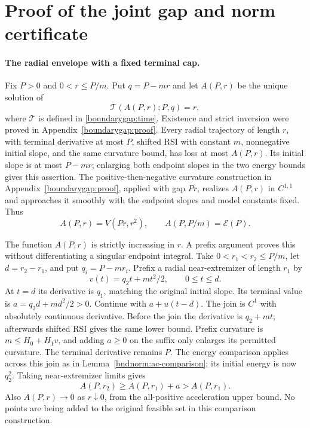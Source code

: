 \section{Proof of the joint gap and norm certificate}
\label{joint:proof}

\paragraph{The radial envelope with a fixed terminal cap.}
Fix $P>0$ and $0<r\le P/m$. Put $q=P-mr$ and let $A(P,r)$ be
the unique solution of
\[
 \mathcal T(A(P,r);P,q)=r,
\]
where $\mathcal T$ is defined in \eqref{boundarygap:time}.
Existence and strict inversion were proved in
Appendix~\ref{boundarygap:proof}. Every radial trajectory of length
$r$, with terminal derivative at most $P$, shifted RSI with constant
$m$, nonnegative initial slope, and the same curvature bound, has
loss at most $A(P,r)$. Its initial slope is at most $P-mr$;
enlarging both endpoint slopes in the two energy bounds gives this
assertion. The positive-then-negative curvature construction in
Appendix~\ref{boundarygap:proof}, applied with gap $Pr$, realizes
$A(P,r)$ in $C^{1,1}$ and approaches it smoothly with the endpoint
slopes and model constants fixed. Thus
\begin{equation}\label{joint:radial-identity}
 A(P,r)=V(Pr,r^2),\qquad A(P,P/m)=\mathcal E(P).
\end{equation}

The function $A(P,r)$ is strictly increasing in $r$. A prefix argument
proves this without differentiating a singular endpoint integral.
Take $0<r_1<r_2\le P/m$, let $d=r_2-r_1$, and put
$q_i=P-mr_i$. Prefix a radial near-extremizer of length $r_1$ by
\[
 v(t)=q_2t+mt^2/2,\qquad 0\le t\le d.
\]
At $t=d$ its derivative is $q_1$, matching the original initial
slope. Its terminal value is
$a=q_2d+md^2/2>0$. Continue with $a+u(t-d)$.
The join is $C^1$ with absolutely continuous derivative. Before
the join the derivative is $q_2+mt$; afterwards shifted RSI gives
the same lower bound. Prefix curvature is $m\le H_0+H_1v$, and
adding $a\ge0$ on the suffix only enlarges its permitted curvature.
The terminal derivative remains $P$. The energy comparison applies
across this join as in Lemma~\ref{bndnorm:ac-comparison}; its initial
energy is now $q_2^2$. Taking near-extremizer limits gives
\[
 A(P,r_2)\ge A(P,r_1)+a>A(P,r_1).
\]
Also $A(P,r)\to0$ as $r\downarrow0$, from the all-positive
acceleration upper bound. No points are being added to the original
feasible set in this comparison construction.

